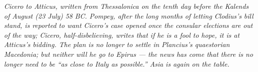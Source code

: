 
\textit{Cicero to Atticus, written from Thessalonica on the
tenth day before the Kalends of August (23 July) 58 BC.
Pompey, after the long months of letting Clodius's bill stand,
is reported to want Cicero's case opened once the consular
elections are out of the way; Cicero, half-disbelieving, writes
that if he is a fool to hope, it is at Atticus's bidding. The
plan is no longer to settle in Plancius's quaestorian
Macedonia; but neither will he go to Epirus --- the news has
come that there is no longer need to be ``as close to Italy
as possible.'' Asia is again on the table.}
